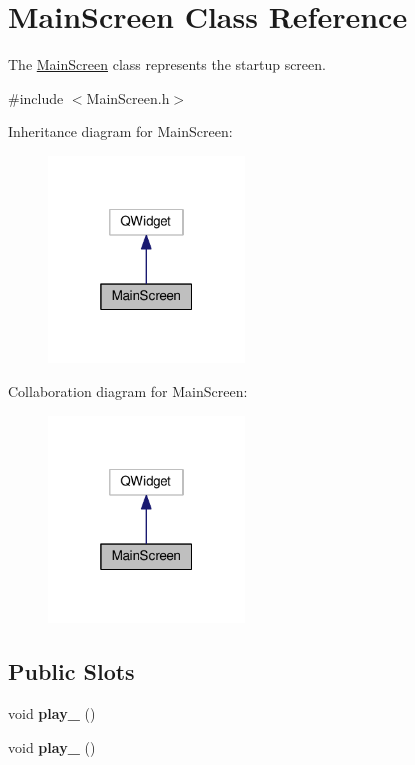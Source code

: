 \hypertarget{class_main_screen}{}\section{Main\+Screen Class Reference}
\label{class_main_screen}


The \hyperlink{class_main_screen}{Main\+Screen} class represents the startup screen.  




{\ttfamily \#include $<$Main\+Screen.\+h$>$}



Inheritance diagram for Main\+Screen\+:
\nopagebreak
\begin{figure}[H]
\begin{center}
\leavevmode
\includegraphics[width=148pt]{class_main_screen__inherit__graph}
\end{center}
\end{figure}


Collaboration diagram for Main\+Screen\+:
\nopagebreak
\begin{figure}[H]
\begin{center}
\leavevmode
\includegraphics[width=148pt]{class_main_screen__coll__graph}
\end{center}
\end{figure}
\subsection*{Public Slots}
\begin{DoxyCompactItemize}
\item 
void {\bfseries play\+\_} ()\hypertarget{class_main_screen_a8803ff60a438d7fdc64a58dcbd10ee84}{}\label{class_main_screen_a8803ff60a438d7fdc64a58dcbd10ee84}

\item 
void {\bfseries play\+\_} ()\hypertarget{class_main_screen_afcd44fd9e2f02c928b97a2d3c61bb8b0}{}\label{class_main_screen_afcd44fd9e2f02c928b97a2d3c61bb8b0}

\end{DoxyCompactItemize}
